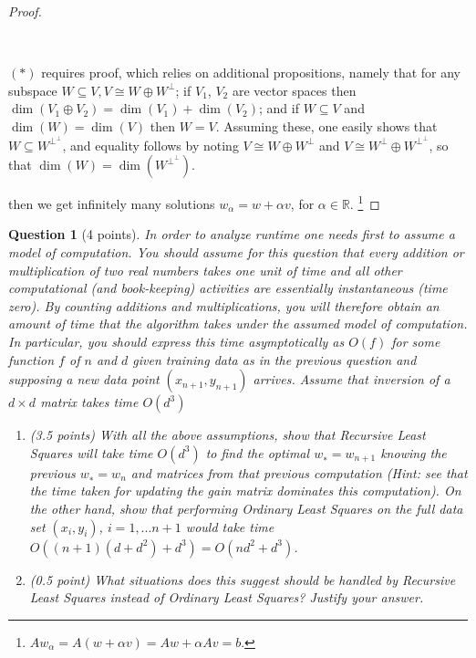 \documentclass[12pt]{article}
\newcommand{\real}{\mathbb{R}}
\newtheorem{question}{Question}
\begin{document}
\begin{proof}
{\begin{indent}
  \end{indent}
  \\
  \begin{indent}
    $(*)$ requires proof, which relies on additional propositions, namely that for any subspace $W \subseteq V, V \cong W \oplus W^{\perp}$; if $V_1$, $V_2$ are vector spaces then $\dim(V_1 \oplus V_2)= \dim(V_1) + \dim(V_2)$; and if $W \subseteq V$ and $\dim(W) = \dim(V)$ then $W=V$. Assuming these, one easily shows that $W \subseteq W^{\perp}^{\perp}$, and equality follows by noting $V \cong W \oplus W^{\perp}$ and $V \cong W^{\perp} \oplus W^{\perp}^{\perp}$, so that $\dim(W) = \dim(W^{\perp}^{\perp})$.
  \end{indent}
  }
  then we get infinitely many solutions $w_{\alpha} = w + \alpha v$, for $\alpha \in \real$.
  \footnote{
  $Aw_{\alpha} = A(w + \alpha v) = Aw + \alpha Av = b$.
  }
\end{proof}
\newpage
\begin{question}[4 points]
  In order to analyze runtime one needs first to assume a model of computation.  You should assume for this question that every addition or multiplication of two real numbers takes one unit of time and all other computational (and book-keeping) activities are essentially instantaneous (time  zero). By  counting  additions and multiplications, you  will therefore obtain an amount of time that the algorithm takes under the assumed model of computation. In particular, you should express this time asymptotically as $O(f)$ for some function $f$ of $n$ and $d$ given training data as in the previous question and supposing a new data point $(x_{n+1}, y_{n+1})$ arrives.  Assume that inversion of a $d \times d$ matrix takes time $O(d^3)$
  \begin{enumerate}
  \item (3.5 points) With all the above assumptions, show that Recursive Least Squares will take time $O(d^3)$ to find the optimal $w_{∗} = w_{n+1}$ knowing the previous $w_{∗}=w_n$ and matrices from that previous computation (Hint:  see that the time taken for updating the gain matrix dominates this computation). On the other hand, show that performing Ordinary Least Squares on the full data set $(x_i, y_i)$, $ i= 1, . . . n+ 1$ would take time $O((n+ 1)(d+d^2) +d^3) =O(nd^2+d^3)$.
  \item
    (0.5 point) What situations does this suggest should be handled by Recursive Least Squares instead of Ordinary Least Squares?  Justify your answer.
  \end{enumerate}
\end{question}
\end{document}

